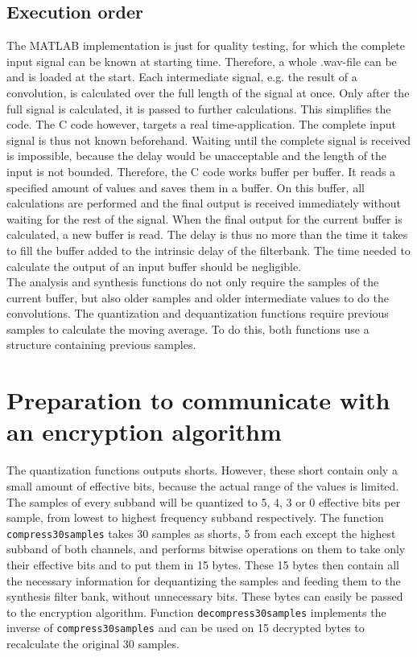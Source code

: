 \documentclass[a4paper]{article}
\begin{document}
\subsection{Execution order}
The MATLAB implementation is just for quality testing, for which the complete input signal can be known at starting time. Therefore, a whole .wav-file can be and is loaded at the start. Each intermediate signal, e.g. the result of a convolution, is calculated over the full length of the signal at once. Only after the full signal is calculated, it is passed to further calculations. This simplifies the code. The C code however, targets a real time-application. The complete input signal is thus not known beforehand. Waiting until the complete signal is received is impossible, because the delay would be unacceptable and the length of the input is not bounded. Therefore, the C code works buffer per buffer. It reads a specified amount of values and saves them in a buffer. On this buffer, all calculations are performed and the final output is received immediately without waiting for the rest of the signal. When the final output for the current buffer is calculated, a new buffer is read. The delay is thus no more than the time it takes to fill the buffer added to the intrinsic delay of the filterbank. The time needed to calculate the output of an input buffer should be negligible. \\

The analysis and synthesis functions do not only require the samples of the current buffer, but also older samples and older intermediate values to do the convolutions. The quantization and dequantization functions require previous samples to calculate the moving average. To do this, both functions use a structure containing previous samples.

\section{Preparation to communicate with an encryption algorithm}\label{sec:communication}
The quantization functions outputs shorts. However, these short contain only a small amount of effective bits, because the actual range of the values is limited. The samples of every subband will be quantized to 5, 4, 3 or 0 effective bits per sample, from lowest to highest frequency subband respectively. The function \texttt{compress30samples} takes 30 samples as shorts, 5 from each except the highest subband of both channels, and performs bitwise operations on them to take only their effective bits and to put them in 15 bytes.  These 15 bytes then contain all the necessary information for dequantizing the samples and feeding them to the synthesis filter bank, without unnecessary bits. These bytes can easily be passed to the encryption algorithm. Function \texttt{decompress30samples} implements the inverse of \texttt{compress30samples} and can be used on 15 decrypted bytes to 
recalculate the original 30 samples.
\end{document}
